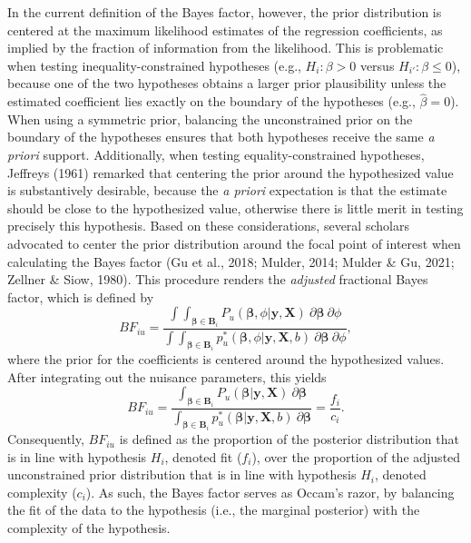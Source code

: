 \documentclass[
]{interact}
\begin{document}
In the current definition of the Bayes factor, however, the prior
distribution is centered at the maximum likelihood estimates of the
regression coefficients, as implied by the fraction of information from
the likelihood. This is problematic when testing inequality-constrained
hypotheses (e.g., \(H_i: \beta > 0\) versus \(H_{i'}: \beta \leq 0\)),
because one of the two hypotheses obtains a larger prior plausibility
unless the estimated coefficient lies exactly on the boundary of the
hypotheses (e.g., \(\hat{\beta}=0\)). When using a symmetric prior,
balancing the unconstrained prior on the boundary of the hypotheses
ensures that both hypotheses receive the same \emph{a priori} support.
Additionally, when testing equality-constrained hypotheses, Jeffreys
(1961) remarked that centering the prior around the hypothesized value
is substantively desirable, because the \emph{a priori} expectation is
that the estimate should be close to the hypothesized value, otherwise
there is little merit in testing precisely this hypothesis. Based on
these considerations, several scholars advocated to center the prior
distribution around the focal point of interest when calculating the
Bayes factor (Gu et al., 2018; Mulder, 2014; Mulder \& Gu, 2021; Zellner
              \& Siow, 1980). This procedure renders the \emph{adjusted} fractional
Bayes factor, which is defined by \[
  BF_{iu} = \frac{
    \int \int_{\boldsymbol{\beta} \in \boldsymbol{B}_i} P_u(\boldsymbol{\beta}, \phi | \boldsymbol{y}, \boldsymbol{X}) ~ \partial \boldsymbol{\beta} ~ \partial \phi
  } {
    \int \int_{\boldsymbol{\beta} \in \boldsymbol{B}_i} p^*_u(\boldsymbol{\beta}, \phi| \boldsymbol{y}, \boldsymbol{X}, b) ~ \partial \boldsymbol{\beta} ~ \partial \phi
  },
  \] where the prior for the coefficients is centered around the
hypothesized values. After integrating out the nuisance parameters, this
yields \[
  BF_{iu} = \frac{
    \int_{\boldsymbol{\beta} \in \boldsymbol{B}_i} P_u (\boldsymbol{\beta} | \boldsymbol{y}, \boldsymbol{X}) ~ \partial \boldsymbol{\beta}
  }{
    \int_{\boldsymbol{\beta} \in \boldsymbol{B}_i} p^*_u(\boldsymbol{\beta} | \boldsymbol{y}, \boldsymbol{X}, b) ~ \partial \boldsymbol{\beta}
  }
  = \frac{f_i}{c_i}.
  \] Consequently, \(BF_{iu}\) is defined as the proportion of the
posterior distribution that is in line with hypothesis \(H_i\), denoted
fit (\(f_i\)), over the proportion of the adjusted unconstrained prior
distribution that is in line with hypothesis \(H_i\), denoted complexity
(\(c_i\)). As such, the Bayes factor serves as Occam's razor, by
balancing the fit of the data to the hypothesis (i.e., the marginal
posterior) with the complexity of the hypothesis.
\end{document}
